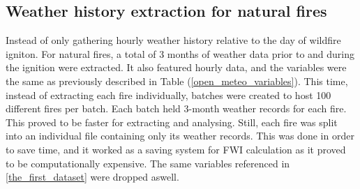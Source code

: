 \subsection{Weather history extraction for natural fires}
Instead of only gathering hourly weather history relative to the day of wildfire igniton. For natural fires, a total of 3 months of weather data prior to and during the ignition were extracted. It also featured hourly data, and the variables were the same as previously described in Table (\ref{open_meteo_variables}).
This time, instead of extracting each fire individually, batches were created to host 100 different fires per batch. Each batch held 3-month weather records for each fire. This proved to be faster for extracting and analysing. Still, each fire was split into an individual file containing only its weather records. This was done in order to save time, and it worked as a saving system for FWI calculation as it proved to be computationally expensive.
The same variables referenced in \ref{the_first_dataset}  were dropped aswell.

